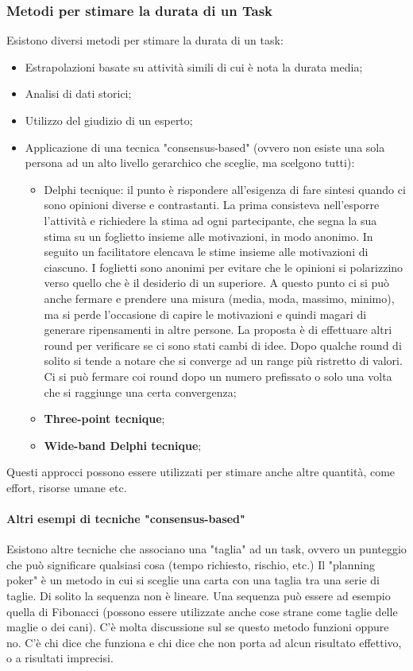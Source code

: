 \subsubsection{Metodi per stimare la durata di un Task}
Esistono diversi metodi per stimare la durata di un task:
\begin{itemize}
	\item Estrapolazioni basate su attività simili di cui è nota la durata media;
	\item Analisi di dati storici;
	\item Utilizzo del giudizio di un esperto;
	\item Applicazione di una tecnica "consensus-based" (ovvero non esiste una sola persona ad un alto livello gerarchico che sceglie, ma scelgono tutti):
	\begin{itemize}
		\item Delphi tecnique: il punto è rispondere all'esigenza di fare sintesi quando ci sono opinioni diverse e contrastanti. La prima consisteva nell'esporre l'attività e richiedere la stima ad ogni partecipante, che segna la sua stima su un foglietto insieme alle motivazioni, in modo anonimo. In seguito un facilitatore elencava le stime insieme alle motivazioni di ciascuno. I foglietti sono anonimi per evitare che le opinioni si polarizzino verso quello che è il desiderio di un superiore. A questo punto ci si può anche fermare e prendere una misura (media, moda, massimo, minimo), ma si perde l'occasione di capire le motivazioni e quindi magari di generare ripensamenti in altre persone. La proposta è di effettuare altri round per verificare se ci sono stati cambi di idee. Dopo qualche round di solito si tende a notare che si converge ad un range più ristretto di valori. Ci si può fermare coi round dopo un numero prefissato o solo una volta che si raggiunge una certa convergenza;
		\item \textbf{Three-point tecnique};
		\item \textbf{Wide-band Delphi tecnique};
	\end{itemize}
\end{itemize}
Questi approcci possono essere utilizzati per stimare anche altre quantità, come effort, risorse umane etc.

\paragraph{Altri esempi di tecniche "consensus-based"}
Esistono altre tecniche che associano una "taglia" ad un task, ovvero un punteggio che può significare qualsiasi cosa (tempo richiesto, rischio, etc.)
Il "planning poker" è un metodo in cui si sceglie una carta con una taglia tra una serie di taglie. Di solito la sequenza non è lineare. Una sequenza può essere ad esempio quella di Fibonacci (possono essere utilizzate anche cose strane come taglie delle maglie o dei cani). C'è molta discussione sul se questo metodo funzioni oppure no. C'è chi dice che funziona e chi dice che non porta ad alcun risultato effettivo, o a risultati imprecisi.

